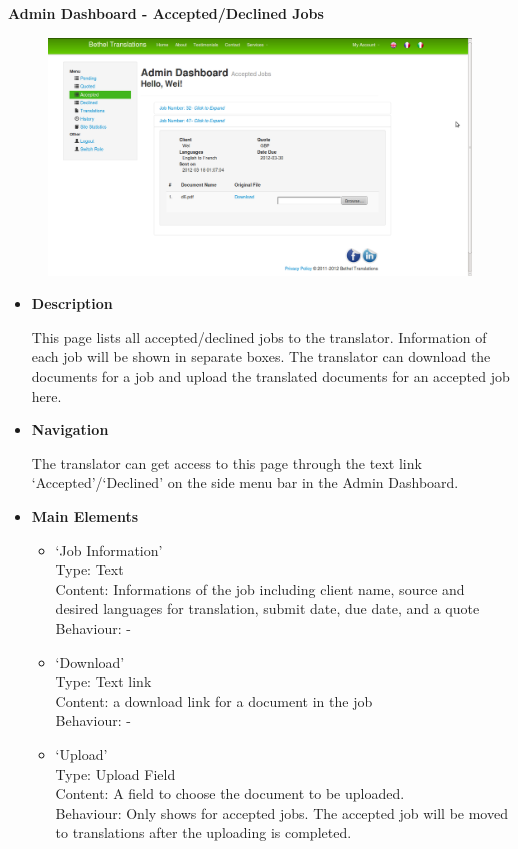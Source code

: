 \documentclass{l3proj}
\begin{document}
\textbf{Admin Dashboard - Accepted/Declined Jobs}
\begin{figure}[H]
\centering
\includegraphics[width=0.8\linewidth]{images/adminDashAccepted}
\vspace{-30pt}
\end{figure}

\begin{itemize}
\item \textbf{Description}

This page lists all accepted/declined jobs to the translator. Information of each job will be shown in separate boxes. 
The translator can download the documents for a job and upload the translated documents for an accepted job here.

\item \textbf{Navigation}

The translator can get access to this page through the text link `Accepted'/`Declined' on the side menu bar in the Admin Dashboard.

\item \textbf{Main Elements}
\begin{itemize}

\item `Job Information'\\
Type: Text\\
Content: Informations of the job including client name, source and desired languages for translation, submit date, due date, and a quote \\
Behaviour: -\\

\item `Download'\\
Type: Text link\\
Content: a download link for a document in the job\\
Behaviour: -\\

\item `Upload'\\
Type: Upload Field\\
Content: A field to choose the document to be uploaded.\\
Behaviour: Only shows for accepted jobs. The accepted job will be moved to translations after the uploading is completed.\\

\end{itemize}
\end{itemize}
\end{document}
